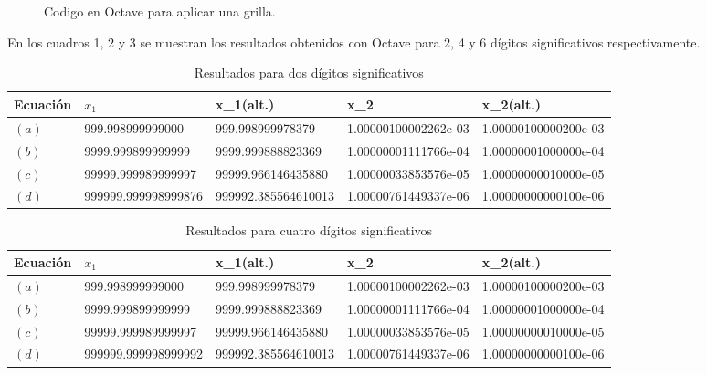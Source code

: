 \documentclass[a4paper, 10pt, spanish]{article}
\begin{document}
\begin{figure}
\noindent\fbox{%
    \parbox{\textwidth}{%

}%
}\\
\\
\caption{Codigo en Octave para aplicar una grilla.}
\end{figure}

En los cuadros 1, 2 y 3 se muestran los resultados obtenidos con Octave para 2, 4 y 6 dígitos significativos respectivamente.

\begin{table}
\begin{center}
  \begin{tabular}{ | l | l | l| l | p{3.5cm} |}
    \hline
    Ecuación   & $x_{1}                 $ &  x_{1(alt.)}          & x_{2}                   & x_{2(alt.)}         \\ \hline
    $(a)     $ & 999.998999999000         &    999.998999978379   & 1.00000100002262e-03    & 1.00000100000200e-03\\ \hline
    $(b)     $ & 9999.999899999999        &  9999.999888823369    & 1.00000001111766e-04    & 1.00000001000000e-04\\ \hline
    $(c)     $ & 99999.999989999997       &  99999.966146435880   & 1.00000033853576e-05    & 1.00000000010000e-05\\ \hline
    $(d)     $ & 999999.999998999876      &  999992.385564610013  & 1.00000761449337e-06    & 1.00000000000100e-06\\ \hline
    
    \end{tabular}
\caption{Resultados para dos dígitos significativos}
\end{center}
\end{table} 

\begin{table}
\begin{center}
  \begin{tabular}{ | l | l | l| l | p{3.5cm} |}
    \hline
    Ecuación   & $x_{1}                 $ &  x_{1(alt.)}          & x_{2}                   & x_{2(alt.)}         \\ \hline
    $(a)     $ & 999.998999999000         &    999.998999978379   & 1.00000100002262e-03    & 1.00000100000200e-03\\ \hline
    $(b)     $ & 9999.999899999999        &  9999.999888823369    & 1.00000001111766e-04    & 1.00000001000000e-04\\ \hline
    $(c)     $ & 99999.999989999997       &  99999.966146435880   & 1.00000033853576e-05    & 1.00000000010000e-05\\ \hline
    $(d)     $ & 999999.999998999992      &  999992.385564610013  & 1.00000761449337e-06    & 1.00000000000100e-06\\ \hline
    
    \end{tabular}
\caption{Resultados para cuatro dígitos significativos}
\end{center}
\end{table}  
\end{document}
